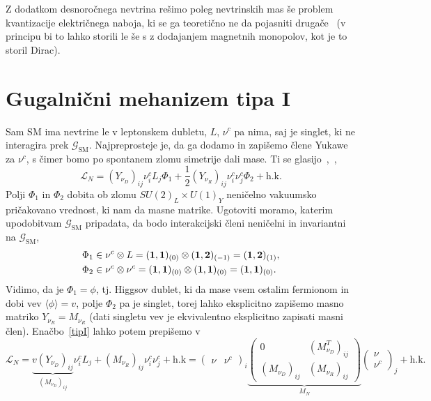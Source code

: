 Z dodatkom desnoročnega nevtrina rešimo poleg nevtrinskih mas še problem kvantizacije električnega naboja,
ki se ga teoretično ne da pojasniti drugače~\cite{mohapatra} (v principu bi to lahko storili le še s
z dodajanjem magnetnih monopolov, kot je to storil Dirac).

\section{Gugalnični mehanizem tipa I}

Sam SM ima nevtrine le v leptonskem dubletu, $L$, $\nu^c$ pa nima, saj je singlet, ki ne interagira
prek $\mathcal{G}_\text{SM}$. Najpreprosteje je, da ga dodamo in zapišemo člene Yukawe za $\nu^c$,
s čimer bomo po spontanem zlomu simetrije dali mase. Ti se glasijo~\cite{strumia},~\cite{miha},~\cite{nugut}
\begin{equation}
	\mathcal{L}_N = (Y_{\nu_D})_{ij} \nu^c_i L_j \Phi_1 +
		\frac{1}{2}(Y_{\nu_R})_{ij}\nu^c_i\nu^c_j\Phi_2 + \text{h.k.}
	\label{tipI}
\end{equation}
Polji $\Phi_1$ in $\Phi_2$ dobita ob zlomu $SU(2)_L\times U(1)_Y$ neničelno vakuumsko pričakovano
vrednost, ki nam da masne matrike. Ugotoviti moramo, katerim upodobitvam $\mathcal{G}_\text{SM}$
pripadata, da bodo interakcijski členi neničelni in invariantni na $\mathcal{G}_\text{SM}$,
\begin{align}
	\Phi_1 &\in \nu^c \otimes L = (\mathbf{1}, \mathbf{1})_{(0)} \otimes (\mathbf{1}, \mathbf{2})_{(-1)} = (\mathbf{1}, \mathbf{2})_{(1)}, \notag \\
	\Phi_2 &\in \nu^c \otimes \nu^c = (\mathbf{1}, \mathbf{1})_{(0)} \otimes (\mathbf{1}, \mathbf{1})_{(0)} = (\mathbf{1}, \mathbf{1})_{(0)}.
\end{align}
Vidimo, da je $\Phi_1 = \phi$, tj. Higgsov dublet, ki da mase vsem ostalim fermionom in dobi
vev $\langle \phi \rangle = v$, polje $\Phi_2$ pa je singlet, torej lahko eksplicitno zapišemo masno
matriko $Y_{\nu_R} = M_{\nu_R}$ (dati singletu vev je ekvivalentno eksplicitno zapisati
masni člen). Enačbo~\eqref{tipI} lahko potem prepišemo v
\begin{equation}
	\mathcal{L}_N = \underbrace{v(Y_{\nu_D})_{ij}}_{(M_{\nu_D})_{ij}} \nu^c_i L_j + (M_{\nu_R})_{ij}
		\nu^c_i\nu^c_j + \text{h.k} = \begin{pmatrix}
			\nu & \nu^c
		\end{pmatrix}_i \underbrace{\begin{pmatrix}
			0 & (M_{\nu_D}^T)_{ij} \\
			(M_{\nu_D})_{ij} & (M_{\nu_R})_{ij}
		\end{pmatrix}}_{M_N} \begin{pmatrix}
			\nu \\ \nu^c
		\end{pmatrix}_j + \text{h.k.}
\end{equation}
